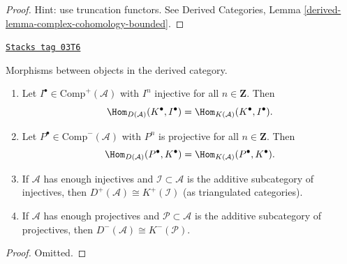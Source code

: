 \begin{proof}
Hint: use truncation functors. See
Derived Categories, Lemma \ref{derived-lemma-complex-cohomology-bounded}.
\end{proof}

\begin{lemma}
\label{trace-lemma-derived-categories}
\href{https://stacks.math.columbia.edu/tag/03T6}{\texttt{Stacks tag 03T6}}

Morphisms between objects in the derived category.
\begin{enumerate}
\item
Let $I^\bullet \in \text{Comp}^+(\mathcal{A})$ with $I^n$ injective for all
$n \in \mathbf{Z}$. Then
$$
\Hom_{D(\mathcal{A})}(K^\bullet, I^\bullet)
=
\Hom_{K(\mathcal{A})}(K^\bullet, I^\bullet).
$$
\item
Let $P^\bullet \in \text{Comp}^-(\mathcal{A})$ with $P^n$ is projective for all
$n \in \mathbf{Z}$. Then
$$
\Hom_{D(\mathcal{A})}(P^\bullet, K^\bullet)
=
\Hom_{K(\mathcal{A})}(P^\bullet, K^\bullet).
$$
\item
If $\mathcal{A}$ has enough injectives and $\mathcal{I} \subset \mathcal{A}$
is the additive subcategory of injectives, then
$
D^+(\mathcal{A})\cong K^+(\mathcal{I})
$
(as triangulated categories).
\item
If $\mathcal{A}$ has enough projectives and $\mathcal{P} \subset \mathcal{A}$
is the additive subcategory of projectives, then
$
D^-(\mathcal{A}) \cong K^-(\mathcal{P}).
$
\end{enumerate}
\end{lemma}

\begin{proof}
Omitted.
\end{proof}

